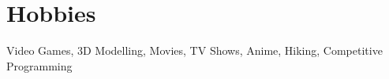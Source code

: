 \documentclass[letterpaper,12pt]{article}
\makeatletter
\newcommand{\resumeOrganizationHeading}[4]{
  \vspace{-2pt}\item
    \begin{tabular*}{0.97\textwidth}[t]{l@{\extracolsep{\fill}}r}
      \textbf{#1} & \textit{\small #2} \\
      \textit{\small#3}
    \end{tabular*}\vspace{-7pt}
}
\newcommand{\resumeSubHeadingListStart}{\begin{itemize}[leftmargin=0.15in, label={}]}
\newcommand{\resumeSubHeadingListEnd}{\end{itemize}}
\makeatother
\begin{document}







\section{Hobbies}
\resumeSubHeadingListStart
\small{\item{Video Games, 3D Modelling, Movies, TV Shows, Anime, Hiking, Competitive Programming }}
\resumeSubHeadingListEnd







\end{document}
